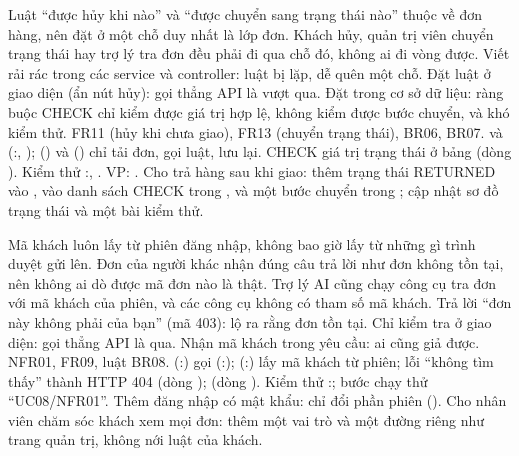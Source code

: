 {Luật ``được hủy khi nào'' và ``được chuyển sang trạng thái nào'' thuộc về đơn hàng, nên đặt ở một chỗ duy nhất là lớp đơn. Khách hủy, quản trị viên chuyển trạng thái hay trợ lý tra đơn đều phải đi qua chỗ đó, không ai đi vòng được.}
{Viết  rải rác trong các service và controller: luật bị lặp, dễ quên một chỗ. Đặt luật ở giao diện (ẩn nút hủy): gọi thẳng API là vượt qua. Đặt trong cơ sở dữ liệu: ràng buộc CHECK chỉ kiểm được giá trị hợp lệ, không kiểm được bước chuyển, và khó kiểm thử.}
{FR11 (hủy khi chưa giao), FR13 (chuyển trạng thái), BR06, BR07.}
{ và  (:\dongOrderCancel, \dongOrderAdvance);  (\dongCancelOrder) và  (\dongUpdateStatus) chỉ tải đơn, gọi luật, lưu lại. CHECK giá trị trạng thái ở bảng  (dòng \dongSqlOrders). Kiểm thử :\dongTestCancel, \dongTestAdvance. VP: .}
{Cho trả hàng sau khi giao: thêm trạng thái RETURNED vào , vào danh sách CHECK trong , và một bước chuyển trong ; cập nhật sơ đồ trạng thái và một bài kiểm thử.}

{Mã khách luôn lấy từ phiên đăng nhập, không bao giờ lấy từ những gì trình duyệt gửi lên. Đơn của người khác nhận đúng câu trả lời như đơn không tồn tại, nên không ai dò được mã đơn nào là thật. Trợ lý AI cũng chạy công cụ tra đơn với mã khách của phiên, và các công cụ không có tham số mã khách.}
{Trả lời ``đơn này không phải của bạn'' (mã 403): lộ ra rằng đơn tồn tại. Chỉ kiểm tra ở giao diện: gọi thẳng API là qua. Nhận mã khách trong yêu cầu: ai cũng giả được.}
{NFR01, FR09, luật BR08.}
{ (:\dongGetOrder) gọi  (:\dongOrderOwned);  (:\dongSessionCustomer) lấy mã khách từ phiên; lỗi ``không tìm thấy'' thành HTTP 404 (dòng \dongNotFound);  (dòng \dongRunTool). Kiểm thử :\dongTestNotFound; bước chạy thử ``UC08/NFR01''.}
{Thêm đăng nhập có mật khẩu: chỉ đổi phần phiên (). Cho nhân viên chăm sóc khách xem mọi đơn: thêm một vai trò và một đường riêng như trang quản trị, không nới luật của khách.}


